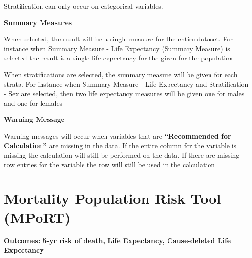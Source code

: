 \documentclass[]{book}
\begin{document}
Stratification can only occur on categorical variables.

\textbf{Summary Measures}

When selected, the result will be a single measure for
the entire dataset. For instance when Summary Measure - Life Expectancy
(Summary Measure) is selected the result is a single life expectancy for
the given for the population.

When stratifications are selected, the summary
measure will be given for each strata. For instance when Summary Measure
- Life Expectancy and Stratification - Sex are selected, then two life
expectancy measures will be given one for males and one for females.

\textbf{Warning Message}

Warning messages will occur when variables that are
\textbf{``Recommended for Calculation''} are missing in the data. If the
entire column for the variable is missing the calculation will still be
performed on the data. If there are missing row entries for the variable
the row will still be used in the calculation


















































\appendix


\chapter{Mortality Population Risk Tool
(MPoRT)}\label{mortality-population-risk-tool-mport}

\textbf{Outcomes: 5-yr risk of death, Life Expectancy, Cause-deleted
Life Expectancy}
\end{document}
